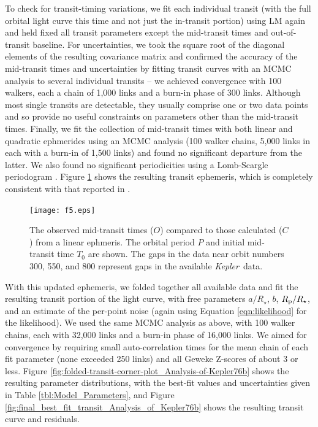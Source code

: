 \documentclass[manuscript]{aastex62}
\newcommand{\kepler}{{\it Kepler}}
\begin{document}
To check for transit-timing variations, we fit each individual transit (with the full orbital light curve this time and not just the in-transit portion) using LM again and held fixed all transit parameters except the mid-transit times and out-of-transit baseline. For uncertainties, we took the square root of the diagonal elements of the resulting covariance matrix \citep[p.~790]{Press:2007:NRE:1403886} and confirmed the accuracy of the mid-transit times and uncertainties by fitting transit curves with an MCMC analysis \citep{2013PASP..125..306F} to several individual transits -- we achieved convergence with 100 walkers, each a chain of 1,000 links and a burn-in phase of 300 links. Although most single transits are detectable, they usually comprise one or two data points and so provide no useful constraints on parameters other than the mid-transit times. Finally, we fit the collection of mid-transit times with both linear and quadratic ephmerides using an MCMC analysis (100 walker chains, 5,000 links in each with a burn-in of 1,500 links) and found no significant departure from the latter. We also found no significant periodicities using a Lomb-Scargle periodogram \citep{1976Ap&SS..39..447L, 1982ApJ...263..835S}. Figure \ref{fig:TTVs_Analysis_of_Kepler76b} shows the resulting transit ephemeris, which is completely consistent with that reported in \citet{2013ApJ...771...26F}. 

\begin{figure}
    \texttt{[image: f5.eps]}
    \caption{The observed mid-transit times ($O$) compared to those calculated ($C$) from a linear ephmeris. The orbital period $P$ and initial mid-transit time $T_0$ are shown. The gaps in the data near orbit numbers 300, 550, and 800 represent gaps in the available \kepler\ data.\label{fig:TTVs_Analysis_of_Kepler76b}}
\end{figure}

With this updated ephemeris, we folded together all available data and fit the resulting transit portion of the light curve, with free parameters $a/R_\star$, $b$, $R_{\rm p}/R_\star$, and an estimate of the per-point noise (again using Equation \ref{eqn:likelihood} for the likelihood). We used the same MCMC analysis as above, with 100 walker chains, each with 32,000 links and a burn-in phase of 16,000 links. We aimed for convergence by requiring small auto-correlation times \citep[e.g.,][]{geyer1992} for the mean chain of each fit parameter (none exceeded 250 links) and all Geweke Z-scores \citep{Geweke92evaluatingthe} of about 3 or less. Figure \ref{fig:folded-transit-corner-plot_Analysis-of-Kepler76b} shows the resulting parameter distributions, with the best-fit values and uncertainties given in Table \ref{tbl:Model_Parameters}, and Figure \ref{fig:final_best_fit_transit_Analysis_of_Kepler76b} shows the resulting transit curve and residuals.
\end{document}

